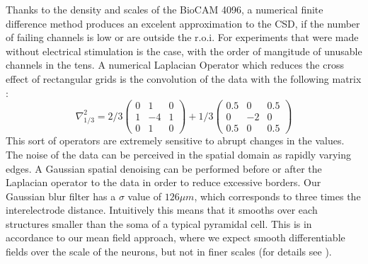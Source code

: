 \documentclass[12pt]{article}
\begin{document}
Thanks to the density and scales of the BioCAM 4096, a numerical finite difference method
produces an excelent approximation to the CSD,
if the number of failing channels is low or
are outside the r.o.i.
For experiments that were made without electrical stimulation is the case, with the order of mangitude of unusable channels in the tens.  A  numerical Laplacian Operator which reduces the cross effect of rectangular grids is the convolution of the data with the following matrix \cite{Lindberg90}:
\begin{equation}
\nabla^2_{1/3}=2/3
\begin{pmatrix}
  0 & 1 & 0 \\
  1 & -4 & 1 \\
  0 & 1 & 0
\end{pmatrix}
+1/3
\begin{pmatrix}
  0.5 & 0 & 0.5 \\
  0 & -2 & 0 \\
  0.5 & 0 & 0.5
\end{pmatrix}  
\end{equation}
This sort of operators are extremely sensitive to abrupt changes in the values. The noise of the data can be perceived in the spatial domain as rapidly varying edges. A Gaussian spatial denoising can be performed before or after the Laplacian operator to the data in order to reduce excessive borders. Our Gaussian blur filter has a $\sigma$ value of $126 \mu m$, which corresponds to three times the interelectrode distance.
Intuitively this means that it smooths over each structures smaller than the soma of a typical pyramidal cell. 
This is  in accordance to our mean field approach, where we expect smooth differentiable fields over the scale of the neurons, but not in finer scales (for details see \cite{Bedard11}).
\end{document}
